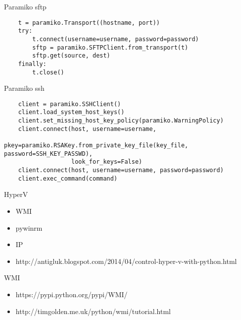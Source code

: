\documentclass{article}
\begin{document}
\LARGE

\begin{center} Paramiko sftp \end{center}
\vspace{15pt}
\begin{lstlisting}
    t = paramiko.Transport((hostname, port))
    try:
        t.connect(username=username, password=password)
        sftp = paramiko.SFTPClient.from_transport(t)
        sftp.get(source, dest)
    finally:
        t.close()
\end{lstlisting}
\newpage

\begin{center} Paramiko ssh \end{center}
\vspace{15pt}
\begin{lstlisting}
    client = paramiko.SSHClient()
    client.load_system_host_keys()
    client.set_missing_host_key_policy(paramiko.WarningPolicy)
    client.connect(host, username=username,
                   pkey=paramiko.RSAKey.from_private_key_file(key_file, password=SSH_KEY_PASSWD),
                   look_for_keys=False)
    client.connect(host, username=username, password=password)
    client.exec_command(command)
\end{lstlisting}
\newpage

\begin{center} HyperV \end{center}
\begin{itemize}
    \item WMI
    \item pywinrm
    \item IP
    \item http://antigluk.blogspot.com/2014/04/control-hyper-v-with-python.html
\end{itemize}
\newpage

\begin{center} WMI \end{center}
\begin{itemize}
    \item https://pypi.python.org/pypi/WMI/
    \item http://timgolden.me.uk/python/wmi/tutorial.html
\end{itemize}
\newpage
\end{document}
